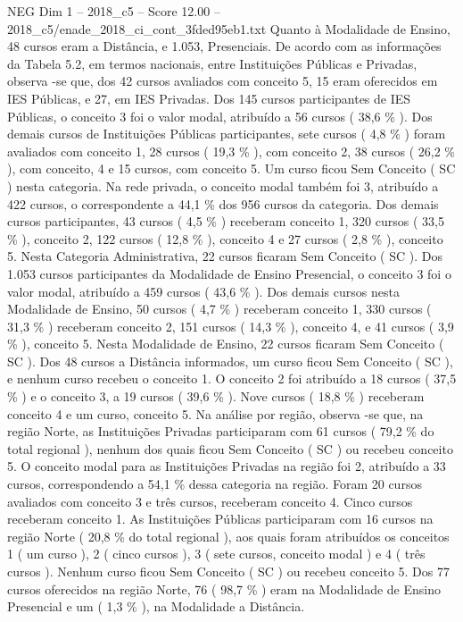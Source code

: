 \begin{textsample}{NEG Dim 1 – 2018\_c5 – Score 12.00 – 2018\_c5/enade\_2018\_ci\_cont\_3fded95eb1.txt}
Quanto à Modalidade de Ensino, 48 cursos eram a Distância, e 1.053, Presenciais.
De acordo com as informações da Tabela 5.2, em termos nacionais, entre Instituições Públicas e Privadas, observa -se que, dos 42 cursos avaliados com conceito 5, 15 eram oferecidos em IES Públicas, e 27, em IES Privadas.
Dos 145 cursos participantes de IES Públicas, o conceito 3 foi o valor modal, atribuído a 56 cursos ( 38,6 \% ).
Dos demais cursos de Instituições Públicas participantes, sete cursos ( 4,8 \% ) foram avaliados com conceito 1, 28 cursos ( 19,3 \% ), com conceito 2, 38 cursos ( 26,2 \% ), com conceito, 4 e 15 cursos, com conceito 5.
Um curso ficou Sem Conceito ( SC ) nesta categoria.
Na rede privada, o conceito modal também foi 3, atribuído a 422 cursos, o correspondente a 44,1 \% dos 956 cursos da categoria.
Dos demais cursos participantes, 43 cursos ( 4,5 \% ) receberam conceito 1, 320 cursos ( 33,5 \% ), conceito 2, 122 cursos ( 12,8 \% ), conceito 4 e 27 cursos ( 2,8 \% ), conceito 5.
Nesta Categoria Administrativa, 22 cursos ficaram Sem Conceito ( SC ).
Dos 1.053 cursos participantes da Modalidade de Ensino Presencial, o conceito 3 foi o valor modal, atribuído a 459 cursos ( 43,6 \% ).
Dos demais cursos nesta Modalidade de Ensino, 50 cursos ( 4,7 \% ) receberam conceito 1, 330 cursos ( 31,3 \% ) receberam conceito 2, 151 cursos ( 14,3 \% ), conceito 4, e 41 cursos ( 3,9 \% ), conceito 5.
Nesta Modalidade de Ensino, 22 cursos ficaram Sem Conceito ( SC ).
Dos 48 cursos a Distância informados, um curso ficou Sem Conceito ( SC ), e nenhum curso recebeu o conceito 1.
O conceito 2 foi atribuído a 18 cursos ( 37,5 \% ) e o conceito 3, a 19 cursos ( 39,6 \% ).
Nove cursos ( 18,8 \% ) receberam conceito 4 e um curso, conceito 5.
Na análise por região, observa -se que, na região Norte, as Instituições Privadas participaram com 61 cursos ( 79,2 \% do total regional ), nenhum dos quais ficou Sem Conceito ( SC ) ou recebeu conceito 5.
O conceito modal para as Instituições Privadas na região foi 2, atribuído a 33 cursos, correspondendo a 54,1 \% dessa categoria na região.
Foram 20 cursos avaliados com conceito 3 e três cursos, receberam conceito 4.
Cinco cursos receberam conceito 1.
As Instituições Públicas participaram com 16 cursos na região Norte ( 20,8 \% do total regional ), aos quais foram atribuídos os conceitos 1 ( um curso ), 2 ( cinco cursos ), 3 ( sete cursos, conceito modal ) e 4 ( três cursos ).
Nenhum curso ficou Sem Conceito ( SC ) ou recebeu conceito 5.
Dos 77 cursos oferecidos na região Norte, 76 ( 98,7 \% ) eram na Modalidade de Ensino Presencial e um ( 1,3 \% ), na Modalidade a Distância.

\end{textsample}

